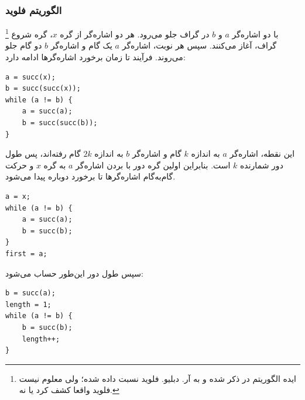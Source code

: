 \subsubsection{الگوریتم فلوید}


\footnote{ایده الگوریتم در \cite{knu982} ذکر شده و به آر. دبلیو. فلوید نسبت داده شده؛ ولی معلوم نیست فلوید واقعا کشف کرد یا نه.} با دو اشاره‌گر $a$ و $b$ در گراف جلو می‌رود.
هر دو اشاره‌گر از گره $x$، گره شروع گراف، آغاز می‌کنند.
سپس هر نوبت، اشاره‌گر $a$ یک گام و اشاره‌گر $b$ دو گام جلو می‌روند.
فرآیند تا زمان برخورد اشاره‌گرها ادامه دارد:
\begin{lstlisting}
a = succ(x);
b = succ(succ(x));
while (a != b) {
    a = succ(a);
    b = succ(succ(b));
}
\end{lstlisting}

این نقطه، اشاره‌گر $a$ به اندازه $k$ گام و اشاره‌گر $b$ به اندازه $2k$ گام رفته‌اند، پس طول دور شمارنده $k$ است.
بنابراین اولین گره دور با بردن اشاره‌گر $a$ به گره $x$ و حرکت گام‌به‌گام اشاره‌گرها تا برخورد دوباره پیدا می‌شود.
\begin{lstlisting}
a = x;
while (a != b) {
    a = succ(a);
    b = succ(b);
}
first = a;
\end{lstlisting}

سپس طول دور این‌طور حساب می‌شود:
\begin{lstlisting}
b = succ(a);
length = 1;
while (a != b) {
    b = succ(b);
    length++;
}
\end{lstlisting}